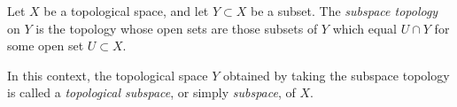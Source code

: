 \documentclass{article}
\begin{document}
Let $X$ be a topological space, and let $Y \subset X$ be a subset. The {\em subspace topology} on $Y$ is the topology whose open sets are those subsets of $Y$ which equal $U \cap Y$ for some open set $U \subset X$.

In this context, the topological space $Y$ obtained by taking the subspace topology is called a {\em topological subspace}, or simply {\em subspace}, of $X$.
\end{document}
